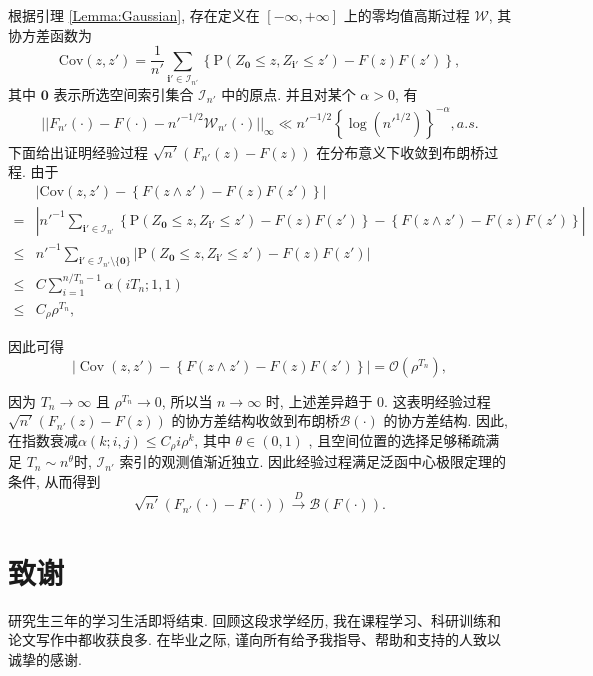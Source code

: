 \documentclass[a4paper,openay,14pt]{ctexbook}
\numberwithin{equation}{section}
\numberwithin{lem}{section}
\begin{document}
    根据引理 \ref{Lemma:Gaussian}, 存在定义在 $[-\infty,+\infty]$ 上的零均值高斯过程 $\mathcal{W}$, 其协方差函数为
$$\text{Cov} (z,z')=\frac{1}{n'}\sum_{\mathbf{i}'\in \mathcal{I}_{n'}}\left\{\mathrm{P}\left(Z_{\mathbf{0}}\le z, Z_{\mathbf{i}'}\le z'\right)-F(z)F(z')\right\},$$ 
其中 $\mathbf{0}$ 表示所选空间索引集合 $\mathcal{I}_{n'}$ 中的原点. 并且对某个 $\alpha>0$, 有
\begin{align}
||F_{n'}(\cdot)-F(\cdot)-n'^{-1/2}\mathcal{W}_{n'}(\cdot)||_{\infty}\ll n'^{-1/2}\left\{\log (n'^{1/2})\right\}^{-\alpha},  a.s.  
\label{EQ:gaussianprocess}
\end{align}
下面给出证明经验过程 $\sqrt{n'}(F_{n'}(z) - F(z))$ 在分布意义下收敛到布朗桥过程. 由于  
\begin{align*}
    &\left| \text{Cov}(z, z') - \left\{F(z \wedge z') - F(z)F(z')\right\} \right| \\
    = &\left| n'^{-1} \sum_{\mathbf{i}' \in \mathcal{I}_{n'}} \left\{\mathrm{P}(Z_{\mathbf{0}} \le z, Z_{\mathbf{i}'} \le z') - F(z)F(z')\right\} - \left\{F(z \wedge z') - F(z)F(z')\right\} \right| \\
    \le &n'^{-1} \sum_{\mathbf{i}' \in \mathcal{I}_{n'} \setminus \{\mathbf{0}\}} \left| \mathrm{P}(Z_{\mathbf{0}} \le z, Z_{\mathbf{i}'} \le z') - F(z)F(z') \right| \\
    \le &C \sum_{i=1}^{n/T_n - 1} \alpha(iT_n; 1, 1) \\
    \le &C_{\rho} \rho^{T_n},
\end{align*}

因此可得
\begin{equation}\label{EQU:cov}
    \left| \operatorname{Cov}(z, z') - \left\{ F(z \wedge z') - F(z)F(z') \right\} \right| = \mathcal{O}(\rho^{T_n}),
\end{equation}

因为 $ T_n \to \infty $ 且 $ \rho^{T_n} \to 0 $, 所以当 $ n \to \infty $ 时, 上述差异趋于 0. 这表明经验过程 $\sqrt{n'}(F_{n'}(z) - F(z))$ 的协方差结构收敛到布朗桥$\mathcal{B}(\cdot)$ 的协方差结构. 因此, 在指数衰减$\alpha(k; i, j) \leq C_\rho i \rho^k$, 其中 $\theta \in (0,1)$ , 且空间位置的选择足够稀疏满足 $T_n \sim n^{\theta}$时, $\mathcal{I}_{n'}$ 索引的观测值渐近独立. 因此经验过程满足泛函中心极限定理的条件, 从而得到
\[
\sqrt{n'}(F_{n'}(\cdot) - F(\cdot)) \overset{D}{\longrightarrow} \mathcal{B}(F(\cdot)).
\]




\backmatter
\clearpage
{}
\chapter*{致谢}
\thispagestyle{fancy}
研究生三年的学习生活即将结束. 回顾这段求学经历,  我在课程学习、科研训练和论文写作中都收获良多. 在毕业之际,  谨向所有给予我指导、帮助和支持的人致以诚挚的感谢.
\end{document}
